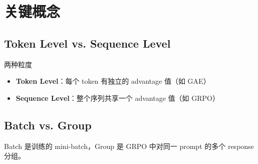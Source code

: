 \section{关键概念}
\subsection{Token Level vs. Sequence Level}
\begin{importantbox}{两种粒度}
\begin{itemize}
  \item \textbf{Token Level}：每个 token 有独立的 advantage 值（如 GAE）
  \item \textbf{Sequence Level}：整个序列共享一个 advantage 值（如 GRPO）
\end{itemize}
\end{importantbox}

\subsection{Batch vs. Group}
Batch 是训练的 mini-batch，Group 是 GRPO 中对同一 prompt 的多个 response 分组。

